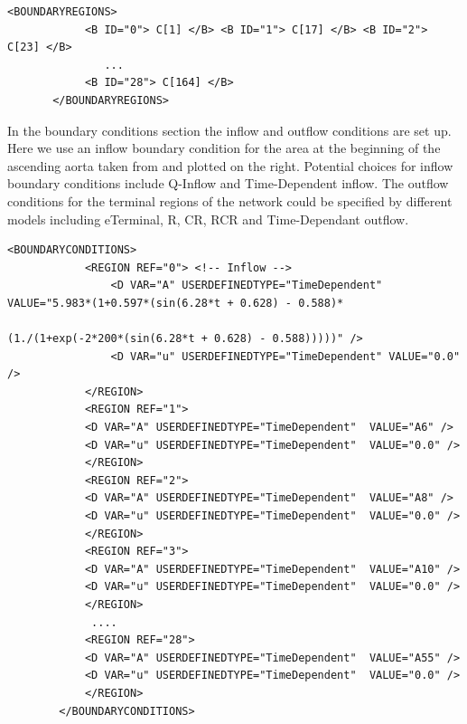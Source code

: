 \begin{lstlisting}[style=XmlStyle]
        <BOUNDARYREGIONS>
            <B ID="0"> C[1] </B> <B ID="1"> C[17] </B> <B ID="2"> C[23] </B>
               ...
            <B ID="28"> C[164] </B>
       </BOUNDARYREGIONS>
\end{lstlisting}

In the boundary conditions section the inflow and outflow conditions are set up.
Here we use an inflow boundary condition for the area at the beginning of
the ascending aorta taken from \cite{ShFoPeFr03} and plotted on the
right. Potential choices for inflow boundary conditions include Q-Inflow
and Time-Dependent inflow. The outflow conditions for the terminal regions of
the network could be specified by different models including eTerminal, R, CR,
RCR and Time-Dependant outflow.

\begin{lstlisting}[style=XmlStyle]
<BOUNDARYCONDITIONS>
            <REGION REF="0"> <!-- Inflow -->
                <D VAR="A" USERDEFINEDTYPE="TimeDependent" VALUE="5.983*(1+0.597*(sin(6.28*t + 0.628) - 0.588)*
                                                         (1./(1+exp(-2*200*(sin(6.28*t + 0.628) - 0.588)))))" />
                <D VAR="u" USERDEFINEDTYPE="TimeDependent" VALUE="0.0" />
            </REGION>
            <REGION REF="1">  
            <D VAR="A" USERDEFINEDTYPE="TimeDependent"  VALUE="A6" />
            <D VAR="u" USERDEFINEDTYPE="TimeDependent"  VALUE="0.0" />
            </REGION>            
            <REGION REF="2"> 
            <D VAR="A" USERDEFINEDTYPE="TimeDependent"  VALUE="A8" />
            <D VAR="u" USERDEFINEDTYPE="TimeDependent"  VALUE="0.0" />
            </REGION>
            <REGION REF="3">   
            <D VAR="A" USERDEFINEDTYPE="TimeDependent"  VALUE="A10" />
            <D VAR="u" USERDEFINEDTYPE="TimeDependent"  VALUE="0.0" />
            </REGION>
             ....
            <REGION REF="28"> 
            <D VAR="A" USERDEFINEDTYPE="TimeDependent"  VALUE="A55" />
            <D VAR="u" USERDEFINEDTYPE="TimeDependent"  VALUE="0.0" />
            </REGION>
        </BOUNDARYCONDITIONS>
\end{lstlisting}

